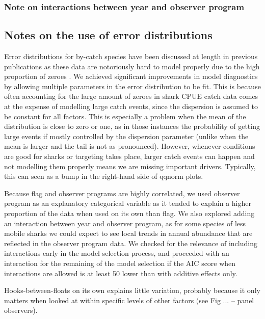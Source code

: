 \documentclass{SCreport}
\begin{document}
\subsubsection{Note on interactions between year and observer program}

\subsection{Notes on the use of error distributions} Error distributions for by-catch species have been discussed at length in previous publications as these data are notoriously hard to model properly due to the high proportion of zeroes \citep{...}. We achieved significant improvements in model diagnostics by allowing multiple parameters in the error distribution to be fit. This is because often accounting for the large amount of zeroes in shark CPUE catch data comes at the expense of modelling large catch events, since the dispersion is assumed to be constant for all factors. This is especially a problem when the mean of the distribution is close to zero or one, as in those instances the probability of getting large events if mostly controlled by the dispersion parameter (unlike when the mean is larger and the tail is not as pronounced). However, whenever conditions are good for sharks or targeting takes place, larger catch events can happen and not modelling them properly means we are missing important drivers. Typically, this can seen as a bump in the right-hand side of qqnorm plots.

Because flag and observer programs are highly correlated, we used
observer program as an explanatory categorical variable as it tended
to explain a higher proportion of the data when used on its own than
flag. We also explored adding an interaction between year and observer
program, as for some species of less mobile sharks we could expect to
see local trends in annual abundance that are reflected in the
observer program data. We checked for the relevance of including
interactions early in the model selection process, and proceeded with
an interaction for the remaining of the model selection if the AIC
score when interactions are allowed is at least 50 lower than with
additive effects only.

Hooks-between-floats on its own explains little variation, probably
because it only matters when looked at within specific levels of
other factors (see Fig ... -- panel observers).
\end{document}
